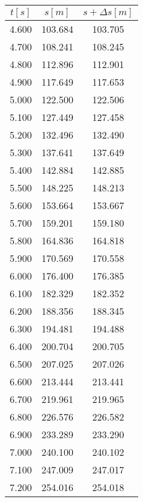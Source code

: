 \documentclass[a4paper,12pt]{article}
\begin{document}
\begin{table}[b]
\centering    
\begin{tabular}{|c|c|c|}
        \hline
        $t[s]$ & $s[m]$ & $s+\Delta s[m]$ \\
        \hline
        4.600&	103.684&	103.705\\
        \hline
        4.700&	108.241&	108.245\\
        \hline
        4.800&	112.896&	112.901\\
        \hline
        4.900&	117.649&	117.653\\
        \hline
        5.000&	122.500&	122.506\\    
        \hline
        5.100&	127.449&	127.458\\
        \hline
        5.200&	132.496&	132.490\\
        \hline
        5.300&	137.641&	137.649\\
        \hline
        5.400&	142.884&	142.885\\
        \hline
        5.500&	148.225&	148.213\\
        \hline
        5.600&	153.664&	153.667\\
        \hline
        5.700&	159.201&	159.180\\
        \hline
        5.800&	164.836&	164.818\\
        \hline
        5.900&	170.569&	170.558\\
        \hline
        6.000&	176.400&	176.385\\
        \hline
        6.100&	182.329&	182.352\\
        \hline
        6.200&	188.356&    188.345\\
        \hline
        6.300&	194.481&	194.488\\
        \hline
        6.400&	200.704&	200.705\\
        \hline
        6.500&	207.025&	207.026\\
        \hline
        6.600&	213.444&	213.441\\
        \hline
        6.700&	219.961&	219.965\\
        \hline
        6.800&	226.576&	226.582\\
        \hline
        6.900&	233.289&	233.290\\
        \hline
        7.000&	240.100&	240.102\\
        \hline
        7.100&	247.009&	247.017\\
        \hline
        7.200&	254.016&	254.018\\

\end{tabular}
\end{table}
\end{document}
